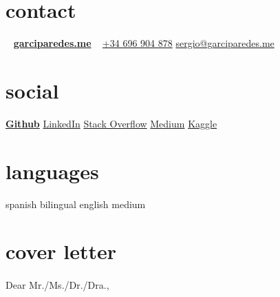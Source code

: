 \documentclass[]{friggeri-cv} %
\begin{document}


    \begin{aside} %

        \section{contact}
            ~
            \href{http://garciparedes.me}{\textbf{garciparedes.me}}
            ~
            \href{tel:+34 696 904 878}{+34 696 904 878}
            \href{mailto:sergio@garciparedes.me}{sergio@garciparedes.me}
        \section{social}
            \href{https://github.com/garciparedes}{\quad{\color{red} $\varheartsuit$}\quad\textbf{Github}\quad\faGithub }
            \href{https://es.linkedin.com/in/garciparedes/en}{LinkedIn\quad\faLinkedin }
            \href{http://stackoverflow.com/users/3921457/garciparedes}{Stack Overflow\quad\faStackOverflow }
            \href{https://medium.com/@garciparedes}{Medium\quad\faMedium }
            \href{https://www.kaggle.com/garciparedes}{Kaggle\quad\faTrophy }
        \section{languages}
            spanish bilingual
            english medium
    \end{aside}




  \section{cover letter}

    \paragraph{}
    \noindent Dear Mr./Ms./Dr./Dra.,
\end{document}
